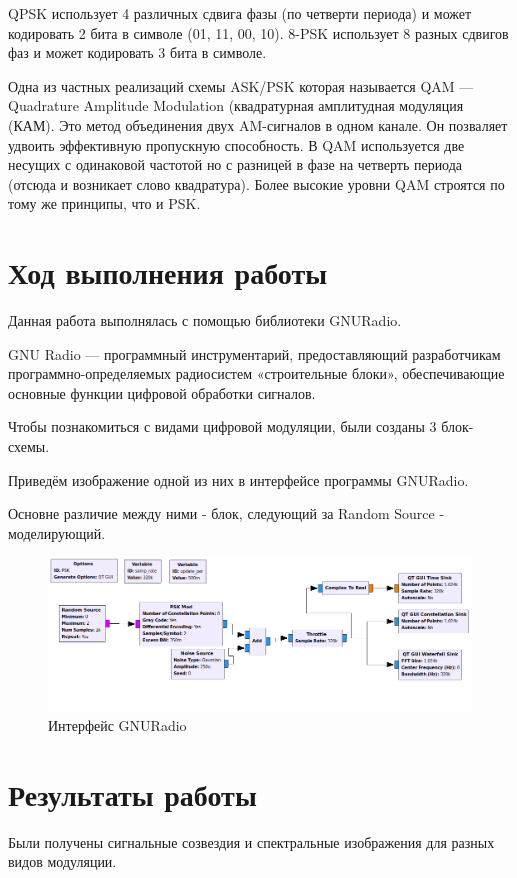 QPSK использует 4 различных сдвига фазы (по четверти периода) и может кодировать 2 бита в символе (01, 11, 00, 10). 8-PSK использует 8 разных сдвигов фаз и может кодировать 3 бита в символе. 

Одна из частных реализаций схемы ASK/PSK которая называется QAM — Quadrature Amplitude Modulation (квадратурная амплитудная модуляция (КАМ). Это метод объединения двух AM-сигналов в одном канале. Он позваляет удвоить эффективную пропускную способность. В QAM используется две несущих с одинаковой частотой но с разницей в фазе на четверть периода (отсюда и возникает слово квадратура). Более высокие уровни QAM строятся по тому же принципы, что и PSK.

\newpage
\section{Ход выполнения работы}
Данная работа выполнялась с помощью библиотеки GNURadio.

GNU Radio — программный инструментарий, предоставляющий разработчикам программно-определяемых радиосистем «строительные блоки», обеспечивающие основные функции цифровой обработки сигналов.

Чтобы познакомиться с видами цифровой модуляции, были созданы 3 блок-схемы.

Приведём изображение одной из них в интерфейсе программы GNURadio.

Основне различие между ними - блок, следующий за Random Source - моделирующий.

\begin{figure}[H]
	\begin{center}
		\includegraphics[width=\linewidth]{pics/GNURadio}
		\caption{Интерфейс GNURadio}
		\label{fig:GNURadio}
	\end{center}
\end{figure}

\newpage
\section{Результаты работы}
Были получены сигнальные созвездия и спектральные изображения для разных видов модуляции.

